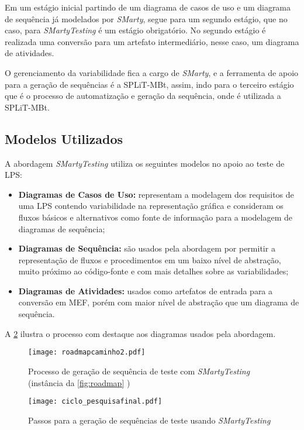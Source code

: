 Em um estágio inicial partindo de um diagrama de casos de uso e um diagrama de sequência já modelados por \textit{SMarty}, segue para um segundo estágio, que no caso, para \textit{SMartyTesting} é um estágio obrigatório. No segundo estágio é realizada uma conversão para um artefato intermediário, nesse caso, um diagrama de atividades.

O gerenciamento da variabilidade fica a cargo de \textit{SMarty}, e a ferramenta de apoio para a geração de sequências é a SPLiT-MBt, assim, indo para o terceiro estágio que é o processo de automatização e geração da sequência, onde é utilizada a SPLiT-MBt.

\subsection{Modelos Utilizados}

A abordagem \textit{SMartyTesting} utiliza os seguintes modelos no apoio ao teste de LPS:
\begin{itemize}
	\item \textbf{Diagramas de Casos de Uso:} representam a modelagem dos requisitos de uma LPS contendo variabilidade na representação gráfica e consideram os fluxos básicos e alternativos como fonte de informação para a modelagem de diagramas de sequência;
	\item \textbf{Diagramas de Sequência:} são usados pela abordagem por permitir a representação de fluxos e procedimentos em um baixo nível de abstração, muito próximo ao código-fonte e com mais detalhes sobre as variabilidades;
	\item \textbf{Diagramas de Atividades:} usados como artefatos  de entrada para a conversão em MEF, porém com maior nível de abstração que um diagrama de sequência.
\end{itemize}

A \ref{fig:ciclopesquisafinal} ilustra o processo com destaque aos diagramas usados pela abordagem.

\begin{landscape}
	\begin{figure}[h!]
		\centering
		\texttt{[image: roadmapcaminho2.pdf]}
		\caption{Processo de geração de sequência de teste com \textit{SMartyTesting} (instância da \ref{fig:roadmap} )}
		\label{fig:roadmapcaminho}
	\end{figure}
\end{landscape}


\begin{figure}[h!]
	\centering
	\texttt{[image: ciclo\_pesquisafinal.pdf]}
	\caption{Passos para a geração de sequências de teste usando \textit{SMartyTesting}}
	\label{fig:ciclopesquisafinal}
\end{figure}


